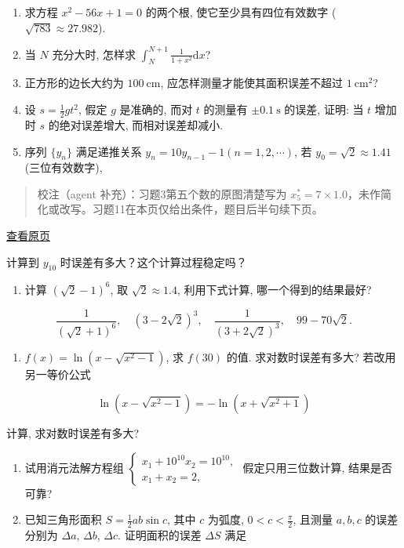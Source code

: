 \documentclass[
  10pt,
  fontset=fandol]{ctexart}
\providecommand{\tightlist}{%
  \setlength{\itemsep}{0pt}\setlength{\parskip}{0pt}}
\begin{document}
\begin{enumerate}
\def\labelenumi{\arabic{enumi}.}
\setcounter{enumi}{6}
\item
  求方程 \(x^2-56x+1=0\) 的两个根, 使它至少具有四位有效数字 (\(\sqrt{783} \approx 27.982\)).
\item
  当 \(N\) 充分大时, 怎样求 \(\int_N^{N+1} \frac{1}{1+x^2} \mathrm{d}x\)?
\item
  正方形的边长大约为 \(100 \mathrm{~cm}\), 应怎样测量才能使其面积误差不超过 \(1 \mathrm{~cm}^2\)?
\item
  设 \(s=\frac{1}{2} g t^2\), 假定 \(g\) 是准确的, 而对 \(t\) 的测量有 \(\pm 0.1 \mathrm{~s}\) 的误差, 证明: 当 \(t\) 增加时 \(s\) 的绝对误差增大, 而相对误差却减小.
\item
  序列 \(\{y_n\}\) 满足递推关系 \(y_n=10y_{n-1}-1 (n=1,2,\cdots)\), 若 \(y_0=\sqrt{2} \approx 1.41\) (三位有效数字),
\end{enumerate}

\begin{quote}
校注（agent 补充）：习题3第五个数的原图清楚写为 \(x_5^*=7\times1.0\)，未作简化或改写。习题11在本页仅给出条件，题目后半句续下页。
\end{quote}

\href{../../source-images/pdf-026.jpeg}{查看原页}

计算到 \(y_{10}\) 时误差有多大？这个计算过程稳定吗？

\begin{enumerate}
\def\labelenumi{\arabic{enumi}.}
\setcounter{enumi}{11}
\tightlist
\item
  计算 \((\sqrt{2}-1)^6\), 取 \(\sqrt{2} \approx 1.4\), 利用下式计算, 哪一个得到的结果最好?
\end{enumerate}

\[
\frac{1}{(\sqrt{2}+1)^6}, \quad (3-2\sqrt{2})^3, \quad \frac{1}{(3+2\sqrt{2})^3}, \quad 99-70\sqrt{2}.
\]

\begin{enumerate}
\def\labelenumi{\arabic{enumi}.}
\setcounter{enumi}{12}
\tightlist
\item
  \(f(x)=\ln(x-\sqrt{x^2-1})\), 求 \(f(30)\) 的值. 求对数时误差有多大? 若改用另一等价公式
\end{enumerate}

\[
\ln(x-\sqrt{x^2-1})=-\ln(x+\sqrt{x^2+1})
\]

计算, 求对数时误差有多大?

\begin{enumerate}
\def\labelenumi{\arabic{enumi}.}
\setcounter{enumi}{13}
\item
  试用消元法解方程组 \(\begin{cases} x_1+10^{10}x_2=10^{10}, \\ x_1+x_2=2, \end{cases}\) 假定只用三位数计算, 结果是否可靠?
\item
  已知三角形面积 \(S=\frac{1}{2}ab\sin c\), 其中 \(c\) 为弧度, \(0<c<\frac{\pi}{2}\), 且测量 \(a, b, c\) 的误差分别为 \(\Delta a\), \(\Delta b\), \(\Delta c\). 证明面积的误差 \(\Delta S\) 满足
\end{enumerate}
\end{document}
